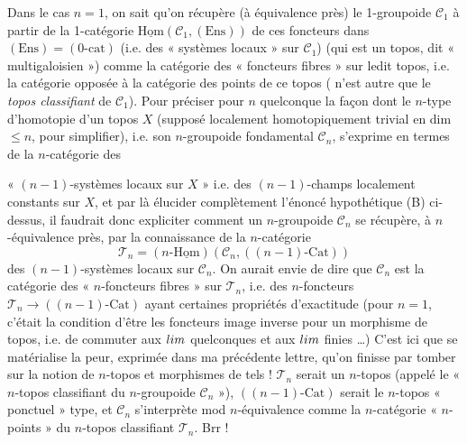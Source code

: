 \documentclass[11pt,a4paper]{article}
\begin{document}
Dans le cas $n = 1$, on sait qu'on récupère (à équivalence près) le 1-groupoide $\mathcal{C}_1$ à partir de la 1-catégorie $\underline{\mathrm{Hom}}(\mathcal{C}_1, (\mathrm{Ens}))$ de ces foncteurs dans $(\mathrm{Ens}) = (0\text{-}\mathrm{cat})$ (i.e. des « systèmes locaux » sur $\mathcal{C}_1$) (qui est un topos, dit « multigaloisien ») comme la catégorie des « foncteurs fibres » sur ledit topos, i.e. la catégorie opposée à la catégorie des points de ce topos (\struck{\ill{}}  n'est autre que le \emph{topos classifiant} de $\mathcal{C}_1$). Pour préciser pour $n$ quelconque la façon dont le $n$-type d'homotopie d'un topos $X$ (supposé localement homotopiquement trivial en dim~$\leqslant n$, pour simplifier), i.e. son $n$-groupoide fondamental $\mathcal{C}_n$, s'exprime en termes de la $n$-catégorie des

« $(n-1)$-systèmes locaux sur $X$ » i.e. des $(n-1)$-champs localement constants sur $X$, et par là élucider complètement l'énoncé hypothétique (B) ci-dessus, il faudrait donc expliciter comment un $n$-groupoide $\mathcal{C}_n$ se récupère, à $n$-équivalence près, par la connaissance de la $n$-catégorie
\[
\mathcal{T}_n = (n\text{-}\underline{\mathrm{Hom}})(\mathcal{C}_n, ((n-1)\text{-}\mathrm{Cat}))
\]
des $(n-1)$-systèmes locaux sur $\mathcal{C}_n$. On aurait envie de dire que $\mathcal{C}_n$ est la catégorie des « $n$-foncteurs fibres » sur $\mathcal{T}_n$, i.e. des $n$-foncteurs $\mathcal{T}_n \to ((n-1)\text{-}\mathrm{Cat})$ ayant certaines propriétés d'exactitude (pour $n = 1$, c'était la condition d'être les foncteurs image inverse pour un morphisme de topos, i.e. de commuter aux $\varinjlim$ quelconques et aux $\varprojlim$ finies …) C'est ici que se matérialise la peur, exprimée dans ma précédente lettre, qu'on finisse par tomber sur la notion de $n$-topos et morphismes de tels ! $\mathcal{T}_n$ serait un $n$-topos (appelé le « $n$-topos classifiant du $n$-groupoide $\mathcal{C}_n$ »), $((n-1)\text{-}\mathrm{Cat})$ serait le $n$-topos « ponctuel » type, et $\mathcal{C}_n$ s'interprète mod $n$-équivalence comme la $n$-catégorie  « $n$-points » du $n$-topos classifiant $\mathcal{T}_n$. Brr !
\end{document}
